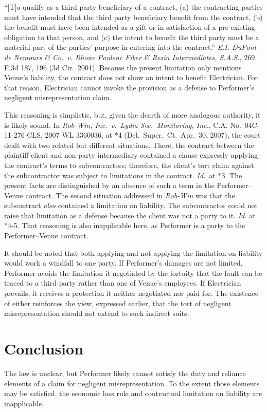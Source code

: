 \documentclass[
  12pt,
  letterpaper,
]{scrartcl}
\begin{document}
``{[}T{]}o qualify as a third party beneficiary of a contract, (a) the
contracting parties must have intended that the third party beneficiary
benefit from the contract, (b) the benefit must have been intended as a
gift or in satisfaction of a pre-existing obligation to that person, and
(c) the intent to benefit the third party must be a material part of the
parties' purpose in entering into the contract.'' \emph{E.I. DuPont de
Nemours \& Co.~v. Rhone Poulenc Fiber \& Resin Intermediates, S.A.S.},
269 F.3d 187, 196 (3d Cir.~2001). Because the present limitation only mentions Venue's liability,
the contract
does not show an intent to benefit Electrician. For that reason,
Electrician cannot invoke the provision as a defense to Performer's
negligent misrepresentation claim.

This reasoning is simplistic, but, given the dearth of more analogous authority, it is likely sound.
In \emph{Rob-Win, Inc.~v.~Lydia Sec.~Monitoring, Inc.}, C.A.
No.~04C-11-276-CLS, 2007 WL 3360036, at *4 (Del.~Super.~Ct.~Apr.~30, 2007), the court dealt with two related but
different situations. There, the contract between the plaintiff client
and non-party intermediary contained a clause expressly applying the
contract's terms to subcontractors; therefore, the client's tort claim
against the subcontractor was subject to limitations in the contract.
\emph{Id.}~at *3. The present facts are distinguished by an absence of such a
term in the Performer--Venue contract. The second situation addressed in
\emph{Rob-Win} was that the subcontract \emph{also} contained a
limitation on liability. The subcontractor could not raise that
limitation as a defense because the client was not a party to it.
\emph{Id.} at *4-5. That reasoning is also inapplicable here, as
Performer is a party to the Performer--Venue contract.

It should be noted that both applying and not applying the limitation on
liability would work a windfall to one party. If Performer's damages are
not limited, Performer avoids the limitation it negotiated by the
fortuity that the fault can be traced to a third party rather than one
of Venue's employees. If Electrician prevails, it receives a protection
it neither negotiated nor paid for. The existence of either reinforces
the view, expressed earlier, that the tort of negligent
misrepresentation should not extend to such indirect suits.

\hypertarget{conclusion}{%
\section{Conclusion}\label{conclusion}}

The law is unclear, but Performer likely cannot satisfy the duty and
reliance elements of a claim for negligent misrepresentation. To the
extent those elements may be satisfied, the economic loss rule and
contractual limitation on liability are inapplicable.
\end{document}
